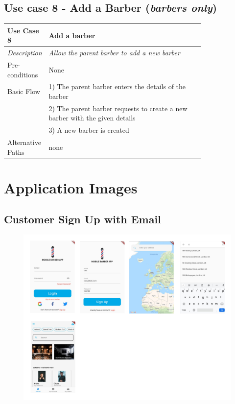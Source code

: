 \documentclass[12pt]{article}
\begin{document}
	\subsection{Use case 8 - Add a Barber (\emph{barbers only})}
	\label{chap:use-cases-8}
	\begin{table}[H]
		\begin{tabular}{|l|p{0.8\linewidth}}
			\hline
			\rowcolor[HTML]{EFEFEF} 
			\textbf{Use Case 8}  & \textbf{Add a barber}                                                       \\ \hline
			\rowcolor[HTML]{F5FBFF} 
			\textit{Description} & \textit{Allow the parent barber to add a new barber}                        \\ \hline
			\rowcolor[HTML]{EFEFEF} 
			Pre-conditions       & None                                                                        \\ \hline
			\rowcolor[HTML]{F5FBFF} 
			Basic Flow           & 1) The parent barber enters the details of the barber                       \\
			\rowcolor[HTML]{F5FBFF} 
			& 2) The parent barber requests to create a new barber with the given details \\
			\rowcolor[HTML]{F5FBFF} 
			& 3) A new barber is created                                                  \\ \hline
			\rowcolor[HTML]{EFEFEF} 
			Alternative Paths    & none                                                                       
		\end{tabular}
	\end{table}
	
	\section{Application Images}
	
	\subsection{Customer Sign Up with Email}
	\label{app-image: sign-up-email}
	\begin{figure}[H]
		\centering
		\includegraphics[scale=0.22]{images/sign-up-email.png}
	\end{figure}
\end{document}
